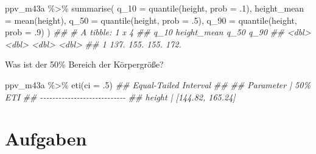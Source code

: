 \documentclass[
  a4paper,
  DIV=11]{scrreprt}
\newenvironment{Shaded}{\begin{snugshade}}{\end{snugshade}}
\newcommand{\AttributeTok}[1]{\textcolor[rgb]{0.40,0.45,0.13}{#1}}
\newcommand{\DecValTok}[1]{\textcolor[rgb]{0.68,0.00,0.00}{#1}}
\newcommand{\DocumentationTok}[1]{\textcolor[rgb]{0.37,0.37,0.37}{\textit{#1}}}
\newcommand{\FunctionTok}[1]{\textcolor[rgb]{0.28,0.35,0.67}{#1}}
\newcommand{\NormalTok}[1]{\textcolor[rgb]{0.00,0.23,0.31}{#1}}
\newcommand{\SpecialCharTok}[1]{\textcolor[rgb]{0.37,0.37,0.37}{#1}}
\theoremstyle{definition}
\theoremstyle{remark}
\begin{document}
\begin{Shaded}
\begin{Highlighting}[]
\NormalTok{ppv\_m43a }\SpecialCharTok{\%\textgreater{}\%} 
  \FunctionTok{summarise}\NormalTok{(}
    \AttributeTok{q\_10 =} \FunctionTok{quantile}\NormalTok{(height, }\AttributeTok{prob =}\NormalTok{ .}\DecValTok{1}\NormalTok{),}
    \AttributeTok{height\_mean =} \FunctionTok{mean}\NormalTok{(height),}
    \AttributeTok{q\_50 =} \FunctionTok{quantile}\NormalTok{(height, }\AttributeTok{prob =}\NormalTok{ .}\DecValTok{5}\NormalTok{),}
    \AttributeTok{q\_90 =} \FunctionTok{quantile}\NormalTok{(height, }\AttributeTok{prob =}\NormalTok{ .}\DecValTok{9}\NormalTok{)}
\NormalTok{  )}
\DocumentationTok{\#\# \# A tibble: 1 x 4}
\DocumentationTok{\#\#    q\_10 height\_mean  q\_50  q\_90}
\DocumentationTok{\#\#   \textless{}dbl\textgreater{}       \textless{}dbl\textgreater{} \textless{}dbl\textgreater{} \textless{}dbl\textgreater{}}
\DocumentationTok{\#\# 1  137.        155.  155.  172.}
\end{Highlighting}
\end{Shaded}

Was ist der 50\% Bereich der Körpergröße?

\begin{Shaded}
\begin{Highlighting}[]
\NormalTok{ppv\_m43a }\SpecialCharTok{\%\textgreater{}\%} 
  \FunctionTok{eti}\NormalTok{(}\AttributeTok{ci =}\NormalTok{ .}\DecValTok{5}\NormalTok{)}
\DocumentationTok{\#\# Equal{-}Tailed Interval}
\DocumentationTok{\#\# }
\DocumentationTok{\#\# Parameter |          50\% ETI}
\DocumentationTok{\#\# {-}{-}{-}{-}{-}{-}{-}{-}{-}{-}{-}{-}{-}{-}{-}{-}{-}{-}{-}{-}{-}{-}{-}{-}{-}{-}{-}{-}}
\DocumentationTok{\#\# height    | [144.82, 165.24]}
\end{Highlighting}
\end{Shaded}

\hypertarget{aufgaben-7}{%
\section{Aufgaben}\label{aufgaben-7}}
\end{document}
